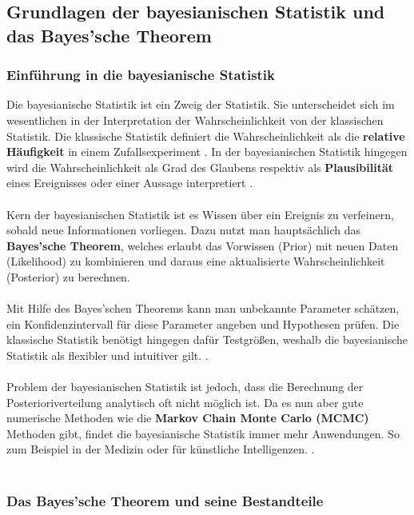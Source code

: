 \documentclass[a4paper,12pt]{article}
\begin{document}
\subsection{Grundlagen der bayesianischen Statistik und das Bayes'sche Theorem}
\subsubsection{Einführung in die bayesianische Statistik}

Die bayesianische Statistik ist ein Zweig der Statistik. Sie unterscheidet sich im wesentlichen in der Interpretation der Wahrscheinlichkeit von der klassischen Statistik. Die klassische Statistik definiert die Wahrscheinlichkeit als die \textbf{relative Häufigkeit} in einem Zufallsexperiment \parencite[2]{StatistikKlassischOderBayes}. In der bayesianischen Statistik hingegen wird die Wahrscheinlichkeit als Grad des Glaubens respektiv als \textbf{Plausibilität} eines Ereignisses oder einer Aussage interpretiert \parencite[1]{EinfBayesStatistik}. \\\\
Kern der bayesianischen Statistik ist es Wissen über ein Ereignis zu verfeinern, sobald neue Informationen vorliegen. Dazu nutzt man hauptsächlich das \textbf{Bayes'sche Theorem}, welches erlaubt das Vorwissen (Prior) mit neuen Daten (Likelihood) zu kombinieren und daraus eine aktualisierte Wahrscheinlichkeit (Posterior) zu berechnen. \\\\
Mit Hilfe des Bayes'schen Theorems kann man unbekannte Parameter schätzen, ein Konfidenzintervall für diese Parameter angeben und Hypothesen prüfen. Die klassische Statistik benötigt hingegen dafür Testgrößen, weshalb die bayesianische Statistik als flexibler und intuitiver gilt. \parencite[1]{EinfBayesStatistik}. \\\\
Problem der bayesianischen Statistik ist jedoch, dass die Berechnung der Posterioriverteilung analytisch oft nicht möglich ist. Da es nun aber gute numerische Methoden wie die \textbf{Markov Chain Monte Carlo (MCMC)} Methoden gibt, findet die bayesianische Statistik immer mehr Anwendungen. So zum Beispiel in der Medizin oder für künstliche Intelligenzen. \parencite[1]{StatistikKlassischOderBayes}.\\\\

\subsubsection{Das Bayes'sche Theorem und seine Bestandteile}
\end{document}
